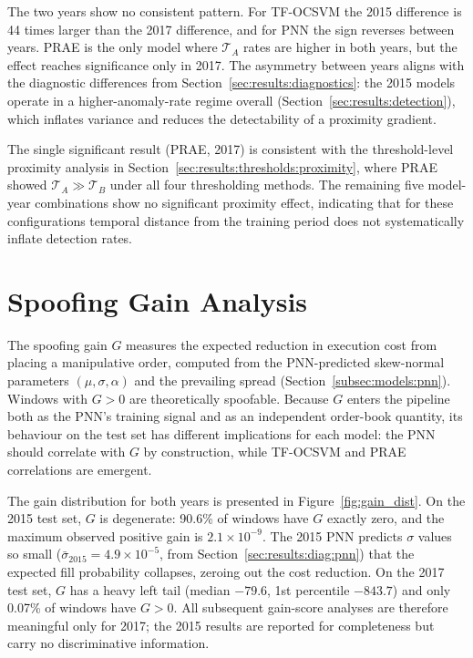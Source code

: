 \documentclass[11pt]{report}
\begin{document}
The two years show no consistent pattern. For TF-OCSVM the 2015 difference is 44 times larger than the 2017 difference, and for PNN the sign reverses between years. PRAE is the only model where $\mathcal{T}_A$ rates are higher in both years, but the effect reaches significance only in 2017. The asymmetry between years aligns with the diagnostic differences from Section~\ref{sec:results:diagnostics}: the 2015 models operate in a higher-anomaly-rate regime overall (Section~\ref{sec:results:detection}), which inflates variance and reduces the detectability of a proximity gradient.

The single significant result (PRAE, 2017) is consistent with the threshold-level proximity analysis in Section~\ref{sec:results:thresholds:proximity}, where PRAE showed $\mathcal{T}_A \gg \mathcal{T}_B$ under all four thresholding methods. The remaining five model-year combinations show no significant proximity effect, indicating that for these configurations temporal distance from the training period does not systematically inflate detection rates.


\section{Spoofing Gain Analysis}\label{sec:results:spoofing}

The spoofing gain $G$ measures the expected reduction in execution cost from placing a manipulative order, computed from the PNN-predicted skew-normal parameters $(\mu, \sigma, \alpha)$ and the prevailing spread (Section~\ref{subsec:models:pnn}).  Windows with $G > 0$ are theoretically spoofable. Because $G$ enters the pipeline both as the PNN's training signal and as an independent order-book quantity, its behaviour on the test set has different implications for each model: the PNN should correlate with $G$ by construction, while TF-OCSVM and PRAE correlations are emergent.

The gain distribution for both years is presented in Figure~\ref{fig:gain_dist}. On the 2015 test set, $G$ is degenerate: 90.6\% of windows have $G$ exactly zero, and the maximum observed positive gain is $2.1 \times 10^{-9}$. The 2015 PNN predicts $\sigma$ values so small ($\bar{\sigma}_{2015} = 4.9 \times 10^{-5}$, from Section~\ref{sec:results:diag:pnn}) that the expected fill probability collapses, zeroing out the cost reduction.  On the 2017 test set, $G$ has a heavy left tail (median $-79.6$, 1st percentile $-843.7$) and only 0.07\% of windows have $G > 0$. All subsequent gain-score analyses are therefore meaningful only for 2017; the 2015 results are reported for completeness but carry no discriminative information.
\end{document}
